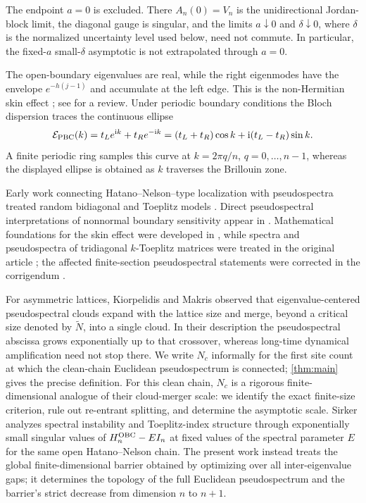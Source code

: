\documentclass[review,hidelinks,onefignum,onetabnum]{siamart251216}
\newcommand{\ii}{\mathrm i}
\begin{document}
The endpoint \(a=0\) is excluded.  There \(A_n(0)=V_n\) is the
unidirectional Jordan-block limit, the diagonal gauge is singular, and the
limits \(a\downarrow0\) and \(\delta\downarrow0\), where \(\delta\) is the
normalized uncertainty level used below, need not commute.  In particular,
the fixed-\(a\) small-\(\delta\) asymptotic is not extrapolated through
\(a=0\).

The open-boundary eigenvalues are real, while the right eigenmodes
have the envelope $e^{-h(j-1)}$ and accumulate at the left edge.  This
is the non-Hermitian skin effect
\cite{OkumaEtAl2020,YaoWang2018,YokomizoMurakami2019}; see
\cite{ZhangEtAl2022} for a review.  Under periodic boundary conditions
the Bloch dispersion traces the continuous ellipse
\[
 \mathcal E_{\rm PBC}(k)=t_Le^{\ii k}+t_Re^{-\ii k}
 =(t_L+t_R)\cos k+\ii(t_L-t_R)\sin k.
\]
A finite periodic ring samples this curve at \(k=2\pi q/n\),
\(q=0,\ldots,n-1\), whereas the displayed ellipse is obtained as \(k\)
traverses the Brillouin zone.

Early work connecting Hatano--Nelson--type localization with
pseudospectra treated random bidiagonal and Toeplitz models
\cite{TrefethenContediniEmbree2001}.  Direct pseudospectral
interpretations of nonnormal boundary sensitivity appear in
\cite{OkumaSato2020,OkumaSato2021}.  Mathematical foundations for the
skin effect were developed in \cite{AmmariEtAl2024}, while spectra and
pseudospectra of tridiagonal $k$-Toeplitz matrices were treated in the
original article \cite{AmmariEtAl2025}; the affected finite-section
pseudospectral statements were corrected in the corrigendum
\cite{AmmariCorrigendum2026}.

For asymmetric lattices,
Kiorpelidis and Makris \cite{KiorpelidisMakris2025} observed that
eigenvalue-centered pseudospectral clouds expand with the lattice size and
merge, beyond a critical size denoted by \(\widetilde N\), into a single
cloud.  In their description the pseudospectral abscissa grows
exponentially up to that crossover, whereas long-time dynamical
amplification need not stop there.  We write \(N_c\) informally for the first
site count at which the clean-chain Euclidean pseudospectrum is connected;
\cref{thm:main} gives the precise definition.  For this clean chain, \(N_c\)
is a rigorous finite-dimensional analogue of their cloud-merger scale: we
identify the exact finite-size criterion, rule out re-entrant splitting, and
determine the asymptotic scale.  Sirker \cite{Sirker2026} analyzes spectral
instability and Toeplitz-index structure through exponentially small singular
values of \(H_n^{\rm OBC}-EI_n\) at fixed values of the spectral parameter
\(E\) for the same open Hatano--Nelson chain.  The present work instead treats
the global finite-dimensional barrier obtained by optimizing over all
inter-eigenvalue gaps; it determines the topology of the full Euclidean
pseudospectrum and the barrier's strict decrease from dimension \(n\) to
\(n+1\).
\end{document}
